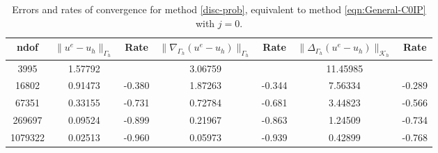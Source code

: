 \documentclass[10pt, a4paper]{amsart}
\newcommand{\nab}{\nabla}
\newcommand{\calK}{\mathcal{K}}
\theoremstyle{definition}
\theoremstyle{remark}
\theoremstyle{example}
\numberwithin{equation}{section}
\begin{document}
\begin{table}[h]
\centering
\caption{\label{tab:MethodJ0}Errors and rates of convergence for method \eqref{disc-prob},
equivalent to method \eqref{eqn:General-C0IP} with $j=0$.}
\begin{tabular}{c c c c c c c}
\hline
ndof & $\|u^e - u_{h}\|_{\Gamma_{h}}$ & Rate  & $\|\nab_{\Gamma_h}(u^e - u_h)\|_{\Gamma_h}$ & Rate  & $\|\Delta_{\Gamma_h}(u^e - u_h)\|_{\calK_h}$ & Rate \\
\hline
3995	&1.57792	&	    &3.06759	&	     &11.45985	&\\
16802	&0.91473	&-0.380	&1.87263	&-0.344	&7.56334	&-0.289\\
67351	&0.33155	&-0.731	&0.72784	&-0.681	&3.44823	&-0.566\\
269697	&0.09524	&-0.899	&0.21967	&-0.863	&1.24509	&-0.734\\
1079322	&0.02513	&-0.960	&0.05973	&-0.939	&0.42899	&-0.768
\end{tabular}
\end{table}
\end{document}
